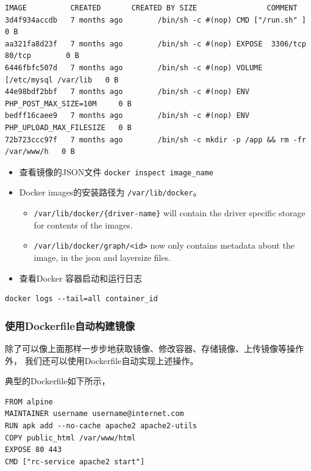 \documentclass[]{article}
\providecommand{\tightlist}{%
  \setlength{\itemsep}{0pt}\setlength{\parskip}{0pt}}
\numberwithin{figure}{section}
\numberwithin{table}{section}
\begin{document}
\begin{verbatim}
IMAGE          CREATED       CREATED BY SIZE                COMMENT
3d4f934accdb   7 months ago        /bin/sh -c #(nop) CMD ["/run.sh" ]               0 B                 
aa321fa8d23f   7 months ago        /bin/sh -c #(nop) EXPOSE  3306/tcp 80/tcp        0 B                 
6446fbfc507d   7 months ago        /bin/sh -c #(nop) VOLUME  [/etc/mysql /var/lib   0 B                 
44e98bdf2bbf   7 months ago        /bin/sh -c #(nop) ENV PHP_POST_MAX_SIZE=10M     0 B                 
bedff16caee9   7 months ago        /bin/sh -c #(nop) ENV  PHP_UPLOAD_MAX_FILESIZE   0 B                 
72b723ccc97f   7 months ago        /bin/sh -c mkdir -p /app && rm -fr /var/www/h   0 B
\end{verbatim}

\begin{itemize}
\item
  查看镜像的JSON文件 \texttt{docker\ inspect\ image\_name}
\item
  Docker images的安装路径为 \texttt{/var/lib/docker}。

  \begin{itemize}
  \tightlist
  \item
    \texttt{/var/lib/docker/\{driver-name\}} will contain the driver specific storage for contents of the images.
  \item
    \texttt{/var/lib/docker/graph/\textless{}id\textgreater{}} now only contains metadata about the image, in the json and layersize files.
  \end{itemize}
\item
  查看Docker 容器启动和运行日志
\end{itemize}

\begin{verbatim}
docker logs --tail=all container_id
\end{verbatim}

\hypertarget{Dockerfile}{%
\subsubsection{使用Dockerfile自动构建镜像}\label{Dockerfile}}

除了可以像上面那样一步步地获取镜像、修改容器、存储镜像、上传镜像等操作外，
我们还可以使用Dockerfile自动实现上述操作。

典型的Dockerfile如下所示，

\begin{verbatim}
FROM alpine
MAINTAINER username username@internet.com
RUN apk add --no-cache apache2 apache2-utils
COPY public_html /var/www/html
EXPOSE 80 443
CMD ["rc-service apache2 start"]
\end{verbatim}
\end{document}
